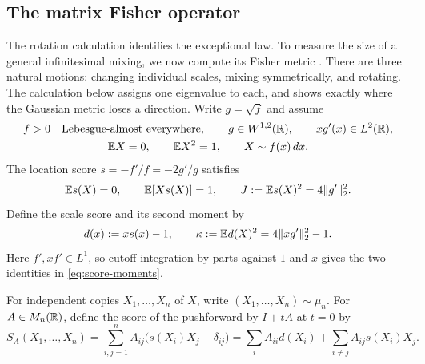\subsection{The matrix Fisher operator}

The rotation calculation identifies the exceptional law. To measure the
size of a general infinitesimal mixing, we now compute its Fisher metric
\cite{amari2000methods}. There are three natural motions: changing individual
scales, mixing symmetrically, and rotating. The calculation below assigns
one eigenvalue to each, and shows exactly where the Gaussian metric loses
a direction. Write \(g=\sqrt f\) and assume
\begin{equation}
 \begin{gathered}
 f>0\quad\text{Lebesgue-almost everywhere},\qquad
 g\in W^{1,2}(\mathbb R),\qquad xg'(x)\in L^2(\mathbb R),\\
 \mathbb E X=0,\qquad \mathbb E X^2=1,
 \qquad X\sim f(x)\,dx.
 \end{gathered}
 \label{eq:fisher-regularity}
\end{equation}
The location score \(s=-f'/f=-2g'/g\) satisfies
\begin{equation}
 \mathbb E s(X)=0,\qquad \mathbb E[Xs(X)]=1,\qquad
 J:=\mathbb E s(X)^2=4\|g'\|_2^2.
 \label{eq:score-moments}
\end{equation}
Define the scale score and its second moment by
\begin{equation}
 d(x):=xs(x)-1,\qquad
 \kappa:=\mathbb E d(X)^2=4\|xg'\|_2^2-1.
\end{equation}
Here \(f',xf'\in L^1\), so cutoff integration by parts against \(1\) and \(x\)
gives the two identities in \eqref{eq:score-moments}.

For independent copies $X_1,\ldots,X_n$ of $X$, write
$(X_1,\ldots,X_n)\sim\mu_n$.  For
$A\in M_n(\mathbb R)$, define the score of the pushforward by $I+tA$ at $t=0$ by
\begin{equation}
 S_A(X_1,\ldots,X_n)=\sum_{i,j=1}^n A_{ij}
       \bigl(s(X_i)X_j-\delta_{ij}\bigr)
       =\sum_i A_{ii}d(X_i)+\sum_{i\ne j}A_{ij}s(X_i)X_j.
\end{equation}

